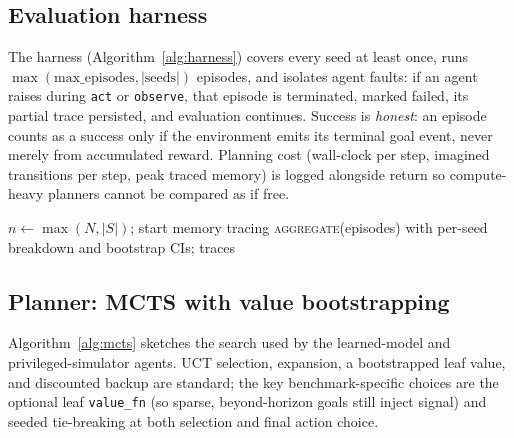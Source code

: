\documentclass[11pt]{article}
\begin{document}
\subsection{Evaluation harness}
The harness (Algorithm~\ref{alg:harness}) covers every seed at least once, runs $\max(\text{max\_episodes}, |\text{seeds}|)$ episodes, and isolates agent faults: if an agent raises during \texttt{act} or \texttt{observe}, that episode is terminated, marked failed, its partial trace persisted, and evaluation continues. Success is \emph{honest}: an episode counts as a success only if the environment emits its terminal goal event, never merely from accumulated reward. Planning cost (wall-clock per step, imagined transitions per step, peak traced memory) is logged alongside return so compute-heavy planners cannot be compared as if free.

\begin{algorithm}[t]
\caption{Evaluation harness for one (environment, agent, track)}\label{alg:harness}
$n \gets \max(N, |S|)$; start memory tracing\;
\Return \textsc{aggregate}(episodes) with per-seed breakdown and bootstrap CIs; traces\;
\end{algorithm}

\subsection{Planner: MCTS with value bootstrapping}
Algorithm~\ref{alg:mcts} sketches the search used by the learned-model and privileged-simulator agents. UCT selection, expansion, a bootstrapped leaf value, and discounted backup are standard; the key benchmark-specific choices are the optional leaf \texttt{value\_fn} (so sparse, beyond-horizon goals still inject signal) and seeded tie-breaking at both selection and final action choice.
\end{document}
